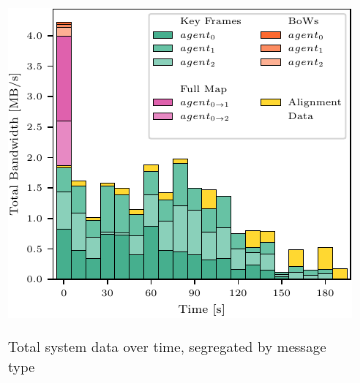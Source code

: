 \begin{figure}[h]
    \centering
    \begin{subfigure}[b]{0.55\linewidth}
        \centering
         {
            \includegraphics[width=\linewidth, valign=t]{figures/apr11_mh_trajectory_b_bandwith.pdf}
        }
        \caption{Total system data over time, segregated by message type}
    \end{subfigure}%
    ~
    \begin{subfigure}[b]{0.45\linewidth}
        \flushright
\end{subfigure}
\end{figure}
